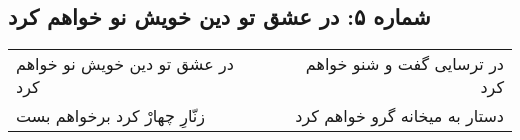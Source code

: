 \begin{center}
\section*{شماره ۵: در عشق تو دین خویش نو خواهم کرد}
\label{sec:005}
\begin{longtable}{l p{0.5cm} r}
در عشق تو دین خویش نو خواهم کرد
&&
در ترسایی گفت و شنو خواهم کرد
\\
زنّارِ چهارْ کرد برخواهم بست
&&
دستار به میخانه گرو خواهم کرد
\\
\end{longtable}
\end{center}

